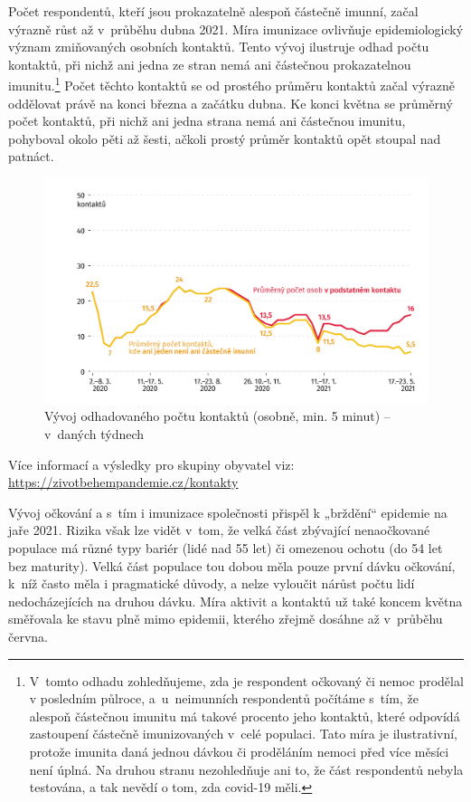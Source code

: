 Počet respondentů, kteří jsou prokazatelně alespoň částečně imunní, začal výrazně růst až v průběhu dubna 2021. Míra imunizace ovlivňuje epidemiologický význam zmiňovaných osobních kontaktů. Tento vývoj ilustruje odhad počtu kontaktů, při nichž ani jedna ze stran nemá ani částečnou prokazatelnou imunitu.\footnote{V tomto odhadu zohledňujeme, zda je respondent očkovaný či nemoc prodělal v posledním půlroce, a u neimunních respondentů počítáme s tím, že alespoň částečnou imunitu má takové procento jeho kontaktů, které odpovídá zastoupení částečně imunizovaných v celé populaci. Tato míra je ilustrativní, protože imunita daná jednou dávkou či proděláním nemoci před více měsíci není úplná. Na druhou stranu nezohledňuje ani to, že část respondentů nebyla testována, a tak nevědí o tom, zda covid-19 měli.} Počet těchto kontaktů se od prostého průměru kontaktů začal výrazně oddělovat právě na konci března a začátku dubna. Ke konci května se průměrný počet kontaktů, při nichž ani jedna strana nemá ani částečnou imunitu, pohyboval okolo pěti až šesti, ačkoli prostý průměr kontaktů opět stoupal nad patnáct.

\begin{figure}[ht]
    \centering
    \includegraphics[width=\textwidth]{./pic/zbp-graf7.png}
    \caption{Vývoj odhadovaného počtu kontaktů (osobně, min. 5 minut) – v daných týdnech}
    \label{fig:zbp7}
\end{figure}

Více informací a výsledky pro skupiny obyvatel viz: \url{https://zivotbehempandemie.cz/kontakty}

Vývoj očkování a s tím i imunizace společnosti přispěl k „brždění“ epidemie na jaře 2021. Rizika však lze vidět v tom, že velká část zbývající nenaočkované populace má různé typy bariér (lidé nad 55 let) či omezenou ochotu (do 54 let bez maturity). Velká část populace tou dobou měla pouze první dávku očkování, k níž často měla i pragmatické důvody, a nelze vyloučit nárůst počtu lidí nedocházejících na druhou dávku. Míra aktivit a kontaktů už také koncem května směřovala ke stavu plně mimo epidemii, kterého zřejmě dosáhne až v průběhu června.

